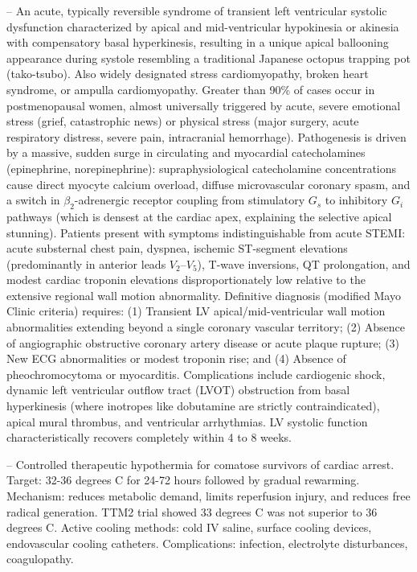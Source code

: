 -- An acute, typically reversible syndrome of transient left ventricular systolic dysfunction characterized by apical and mid-ventricular hypokinesia or akinesia with compensatory basal hyperkinesis, resulting in a unique apical ballooning appearance during systole resembling a traditional Japanese octopus trapping pot (tako-tsubo). Also widely designated stress cardiomyopathy, broken heart syndrome, or ampulla cardiomyopathy. Greater than 90\% of cases occur in postmenopausal women, almost universally triggered by acute, severe emotional stress (grief, catastrophic news) or physical stress (major surgery, acute respiratory distress, severe pain, intracranial hemorrhage). Pathogenesis is driven by a massive, sudden surge in circulating and myocardial catecholamines (epinephrine, norepinephrine): supraphysiological catecholamine concentrations cause direct myocyte calcium overload, diffuse microvascular coronary spasm, and a switch in $\beta_2$-adrenergic receptor coupling from stimulatory $G_s$ to inhibitory $G_i$ pathways (which is densest at the cardiac apex, explaining the selective apical stunning). Patients present with symptoms indistinguishable from acute STEMI: acute substernal chest pain, dyspnea, ischemic ST-segment elevations (predominantly in anterior leads $V_2$--$V_5$), T-wave inversions, QT prolongation, and modest cardiac troponin elevations disproportionately low relative to the extensive regional wall motion abnormality. Definitive diagnosis (modified Mayo Clinic criteria) requires: (1) Transient LV apical/mid-ventricular wall motion abnormalities extending beyond a single coronary vascular territory; (2) Absence of angiographic obstructive coronary artery disease or acute plaque rupture; (3) New ECG abnormalities or modest troponin rise; and (4) Absence of pheochromocytoma or myocarditis. Complications include cardiogenic shock, dynamic left ventricular outflow tract (LVOT) obstruction from basal hyperkinesis (where inotropes like dobutamine are strictly contraindicated), apical mural thrombus, and ventricular arrhythmias. LV systolic function characteristically recovers completely within 4 to 8 weeks.

-- Controlled therapeutic hypothermia for comatose survivors of cardiac arrest. Target: 32-36 degrees C for 24-72 hours followed by gradual rewarming. Mechanism: reduces metabolic demand, limits reperfusion injury, and reduces free radical generation. TTM2 trial showed 33 degrees C was not superior to 36 degrees C. Active cooling methods: cold IV saline, surface cooling devices, endovascular cooling catheters. Complications: infection, electrolyte disturbances, coagulopathy.

